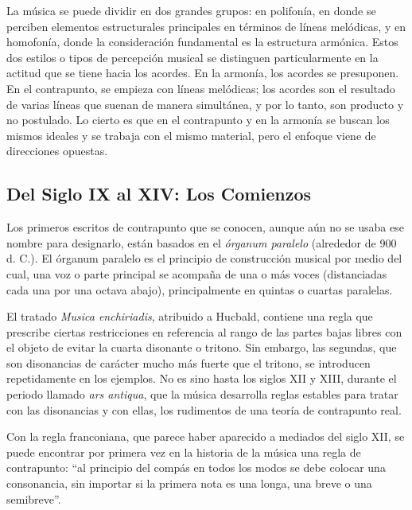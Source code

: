 \documentclass[letterpaper,12pt]{book}
\theoremstyle{definition} \newtheorem{Def}{Definición}[chapter]
\theoremstyle{definition} \newtheorem{Teo}{Teorema}[chapter]
\theoremstyle{definition} \newtheorem{Pro}{Proposición}[chapter]
\theoremstyle{definition} \newtheorem{Lema}{Lema}[chapter]
\begin{document}
La música se puede dividir en dos grandes grupos: en polifonía, en donde se perciben elementos estructurales principales en términos de líneas melódicas, y en homofonía, donde la consideración fundamental es la estructura armónica. Estos dos estilos o tipos de percepción musical se distinguen particularmente en la actitud que se tiene hacia los acordes. En la armonía, los acordes se presuponen. En el contrapunto, se empieza con líneas melódicas; los acordes son el resultado de varias líneas que suenan de manera simultánea, y por lo tanto, son producto y no postulado. Lo cierto es que en el contrapunto y en la armonía se buscan los mismos ideales y se trabaja con el mismo material, pero el enfoque viene de direcciones opuestas. 

\subsection{Del Siglo IX al XIV: Los Comienzos}

Los primeros escritos de contrapunto que se conocen, aunque aún no se usaba ese nombre para designarlo, están basados en el \emph{órganum paralelo} (alrededor de 900 d. C.). El órganum paralelo es el principio de construcción musical por medio del cual, una voz o parte principal se acompaña de una o más voces (distanciadas cada una por una octava abajo), principalmente en quintas o cuartas paralelas. 

El tratado \emph{Musica enchiriadis}, atribuido a Hucbald, contiene una regla que prescribe ciertas restricciones en referencia al rango de las partes bajas libres con el objeto de evitar la cuarta disonante o tritono. Sin embargo, las segundas, que son disonancias de carácter mucho más fuerte que el tritono, se introducen repetidamente en los ejemplos. No es sino hasta los siglos XII y XIII, durante el periodo llamado \emph{ars antiqua}, que la música desarrolla reglas estables para tratar con las disonancias y con ellas, los rudimentos de una teoría de contrapunto real. 

Con la regla franconiana, que parece haber aparecido a mediados del siglo XII, se puede encontrar por primera vez en la historia de la música una regla de contrapunto: ``al principio del compás en todos los modos se debe colocar una consonancia, sin importar si la primera nota es una longa, una breve o una semibreve''. 
\end{document}

